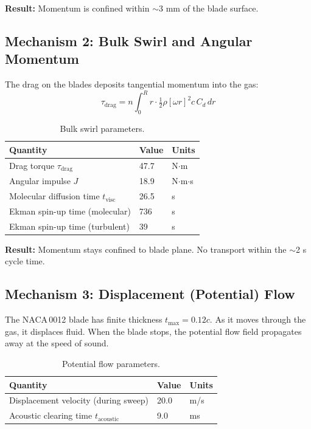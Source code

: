 \documentclass[11pt,a4paper]{article}
\begin{document}
\textbf{Result:} Momentum is confined within $\sim$3 mm of the blade surface.


\subsection{Mechanism 2: Bulk Swirl and Angular Momentum}

The drag on the blades deposits tangential momentum into the gas:
\begin{equation}
  \tau_\mathrm{drag} = n \int_0^R r \cdot \tfrac{1}{2}\rho[\omega r]^2 c\, C_d\, dr
\end{equation}

\begin{table}[H]
\centering
\caption{Bulk swirl parameters.}
\label{tab:swirl}
\begin{tabular}{lll}
\toprule
Quantity & Value & Units \\
\midrule
Drag torque $\tau_\mathrm{drag}$ & 47.7 & N$\cdot$m \\
Angular impulse $J$ & 18.9 & N$\cdot$m$\cdot$s \\
Molecular diffusion time $t_\mathrm{visc}$ & 26.5 & s \\
Ekman spin-up time (molecular) & 736 & s \\
Ekman spin-up time (turbulent) & 39 & s \\
\bottomrule
\end{tabular}
\end{table}

\textbf{Result:} Momentum stays confined to blade plane. No transport
within the $\sim$2 s cycle time.


\subsection{Mechanism 3: Displacement (Potential) Flow}

The NACA\,0012 blade has finite thickness $t_\mathrm{max} = 0.12c$. As it
moves through the gas, it displaces fluid. When the blade stops, the
potential flow field propagates away at the speed of sound.

\begin{table}[H]
\centering
\caption{Potential flow parameters.}
\label{tab:potential}
\begin{tabular}{lll}
\toprule
Quantity & Value & Units \\
\midrule
Displacement velocity (during sweep) & 20.0 & m/s \\
Acoustic clearing time $t_\mathrm{acoustic}$ & 9.0 & ms \\
\bottomrule
\end{tabular}
\end{table}
\end{document}
